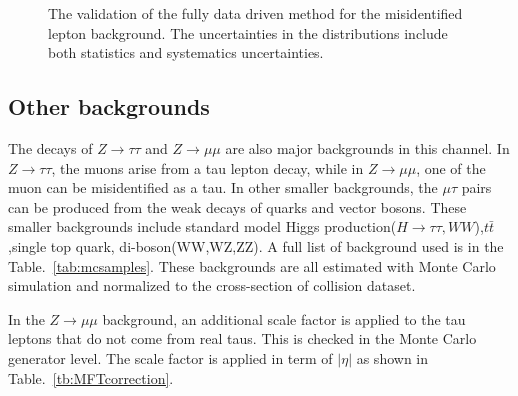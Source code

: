 \begin{figure}[htbp] 
     \centering
     \caption{The validation of the fully data driven method for the misidentified lepton background. The uncertainties in the distributions include both statistics and systematics uncertainties.}
     \label{fig:fakebackgroundValidation}
\end{figure}


\subsection{Other backgrounds}
The decays of $Z \to \tau\tau$ and $Z \to \mu\mu$ are also major backgrounds in this channel. In $Z \to \tau\tau$, the muons arise from a tau lepton decay, while in $Z \to \mu\mu$, one of the muon can be misidentified as a tau. In other smaller backgrounds, the $\mu\tau$ pairs can be produced from the weak decays of quarks and vector bosons. These smaller backgrounds include standard model Higgs production($H \to \tau\tau, WW$),$t\bar{t}$ ,single top quark, di-boson(WW,WZ,ZZ). A full list of background used is in the Table.~\ref{tab:mcsamples}.  These backgrounds are all estimated with Monte Carlo simulation and normalized to the cross-section of collision dataset.

In the $Z \to \mu\mu$  background, an additional scale factor is applied to the tau leptons that do not come from real taus. This is checked in the Monte Carlo generator level. The scale factor is applied in term of $|\eta|$ as shown in Table.~\ref{tb:MFTcorrection}.

